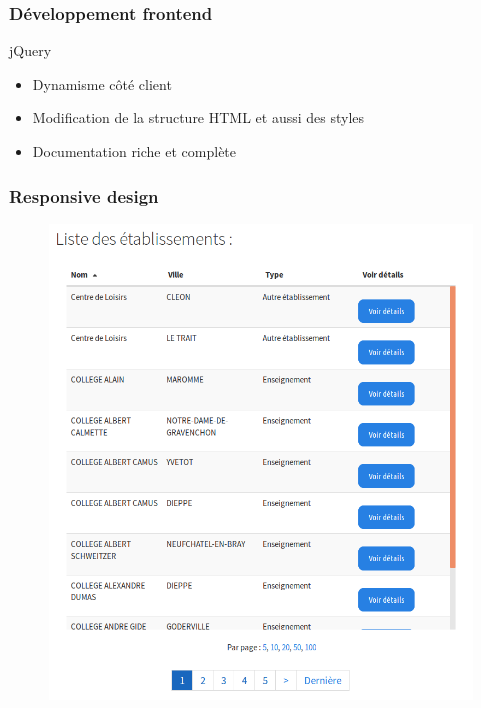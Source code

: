 \begin{frame}
\frametitle{Développement frontend}
\begin{block}{jQuery }
	\begin{itemize}
		\item Dynamisme côté client
		\item Modification de la structure HTML et aussi des styles
		\item Documentation riche et complète
	\end{itemize}
\end{block}
\end{frame}

\begin{frame}
\frametitle{Responsive design}
	\begin{multicols}{2}
		\begin{figure}[!h]
			\begin{center}
				\includegraphics[scale=0.19]{images/screenshot1.png}


\end{center}
\end{figure}
\end{multicols}
\end{frame}
